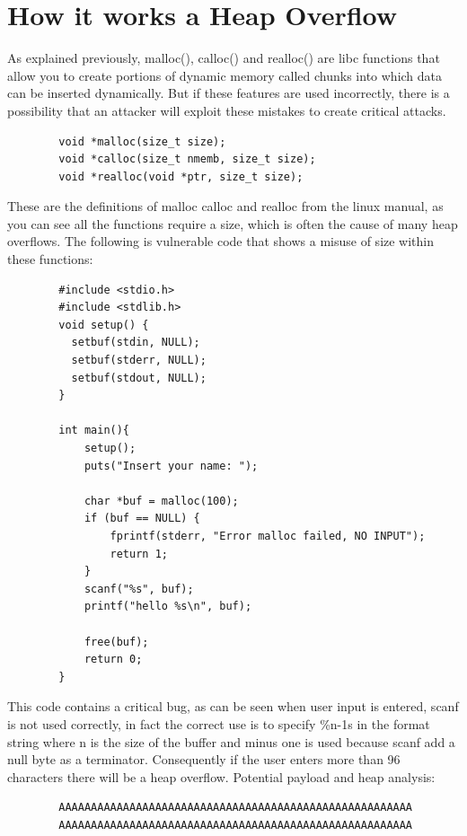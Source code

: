 \documentclass{report}
\begin{document}
    \section{How it works a Heap Overflow}
    As explained previously, malloc(), calloc() and realloc() are libc functions that allow you to create portions of dynamic memory called chunks into which data can be inserted dynamically.
    But if these features are used incorrectly, there is a possibility that an attacker will exploit these mistakes to create critical attacks.
    \begin{verbatim}
        void *malloc(size_t size);
        void *calloc(size_t nmemb, size_t size);
        void *realloc(void *ptr, size_t size);
    \end{verbatim}
    These are the definitions of malloc calloc and realloc from the linux manual, as you can see all the functions require a size, which is often the cause of many heap overflows.
    The following is vulnerable code that shows a misuse of size within these functions:
    \begin{verbatim}
        #include <stdio.h>
        #include <stdlib.h>
        void setup() {
          setbuf(stdin, NULL);
          setbuf(stderr, NULL);
          setbuf(stdout, NULL);
        }
        
        int main(){
            setup();
            puts("Insert your name: ");
        
            char *buf = malloc(100);
            if (buf == NULL) {
                fprintf(stderr, "Error malloc failed, NO INPUT");
                return 1;
            }
            scanf("%s", buf);
            printf("hello %s\n", buf);
        
            free(buf);
            return 0;
        }
    \end{verbatim}
    This code contains a critical bug, as can be seen when user input is entered, scanf is not used correctly, in fact the correct use is to specify \%n-1s in the format string where n is the size of the buffer and minus one is used because scanf add a null byte as a terminator.
    \clearpage
    Consequently if the user enters more than 96 characters there will be a heap overflow.\newline
    Potential payload and heap analysis:
    \begin{verbatim}
        AAAAAAAAAAAAAAAAAAAAAAAAAAAAAAAAAAAAAAAAAAAAAAAAAAAAAAA
        AAAAAAAAAAAAAAAAAAAAAAAAAAAAAAAAAAAAAAAAAAAAAAAAAAAAAAA
    \end{verbatim}
\end{document}
